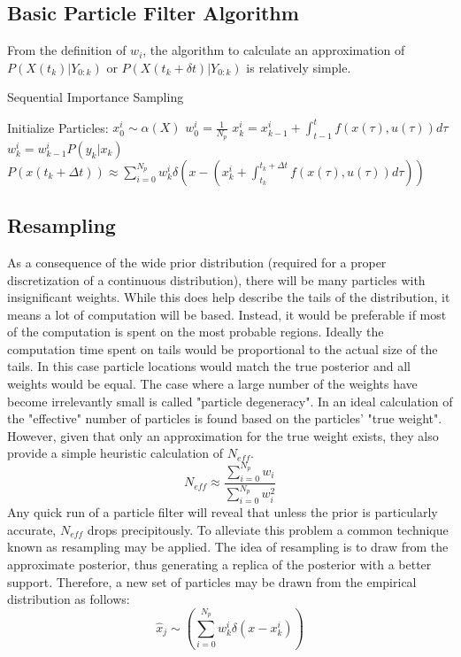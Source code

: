 \subsection{Basic Particle Filter Algorithm}
From the definition of $w_i$, the algorithm to calculate
an approximation of $P(X(t_k) | Y_{0:k})$ or $P(X(t_k + \delta t) | Y_{0:k})$
is relatively simple.

\begin{algorithm}
\caption{Sequential Importance Sampling}
\begin{algorithmic}
\STATE Initialize Particles:
    \STATE $x^i_0  \sim \alpha(X)$
    \STATE $w^i_0 = \frac{1}{N_p}$
\ENDFOR
{}
        \STATE $x^i_k = x^i_{k-1} + \int_{t-1}^t f(x(\tau), u(\tau)) d\tau $
        \STATE $w^i_k = w^i_{k-1}P(y_k | x_k)$
    \ENDFOR
\ENDFOR
\STATE $P(x(t_k+\Delta t)) \approx 
\sum_{i=0}^{N_p} w^i_k \delta\left(x - (x^i_k + \int_{t_k}^{t_k+\Delta t} f(x(\tau), u(\tau)) d\tau) \right)$
\end{algorithmic}
\end{algorithm}

\subsection{Resampling}
\label{sec:Particle Filter Resampling}
As a consequence 
of the wide prior distribution (required for a proper discretization of a continuous
distribution), there will be many particles with insignificant weights. While this does help
describe the tails of the distribution, it means a lot of computation will be based.
Instead, it would be preferable if most of the computation is spent on the most probable regions.
Ideally the computation time spent on tails would be proportional to the actual size of the
tails. In this case particle locations would match the true posterior and all weights would
be equal.  The case where a large number of the weights have become irrelevantly small
is called "particle degeneracy". In  \cite{Liu1998b}
an ideal calculation of the "effective" number of particles is found based on the 
particles' "true weight". However, given that only an approximation for the true weight 
exists, they also provide a simple heuristic calculation of $N_{eff}$.
\begin{equation}
N_{eff} \approx \frac{\sum_{i=0}^{N_p} w_i}{\sum_{i=0}^{N_p} w_i^2}
\label{eq:neff}
\end{equation}
Any quick run of a particle filter will reveal that unless the prior is particularly accurate,
$N_{eff}$ drops precipitously.  To alleviate this problem
a common technique known as resampling may be applied. The idea of resampling is to 
draw from the approximate posterior, thus generating a replica of the posterior with 
a better support. Therefore, a new set of particles may be drawn from the empirical
distribution as follows:
\begin{equation}
\hat{x}_j \sim \left(\sum_{i=0}^{N_p} w^i_k\delta(x - x^i_k)\right)
\end{equation}

